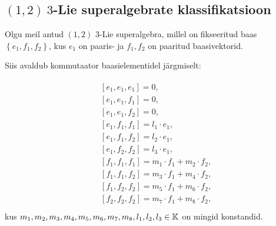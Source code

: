 
\subsection{\texorpdfstring{$(1, 2)\ 3$}\ -Lie superalgebrate klassifikatsioon}

Olgu meil antud $(1, 2)$ 3-Lie superalgebra, millel on fikseeritud baas
$\left\{ e_1, f_1, f_2 \right\}$, kus $e_1$ on paaris- ja
$f_1, f_2$ on paaritud baasivektorid.

Siis avaldub kommutaator baasielementidel järgmiselt:

\begin{align}\label{samasused:1-2}
    \begin{split}
        & \left[ e_1, e_1, e_1 \right] = 0, \\
        & \left[ e_1, e_1, f_1 \right] = 0, \\
        & \left[ e_1, e_1, f_2 \right] = 0, \\
        & \left[ e_1, f_1, f_1 \right] = l_1 \cdot e_1, \\
        & \left[ e_1, f_1, f_2 \right] = l_2 \cdot e_1, \\
        & \left[ e_1, f_2, f_2 \right] = l_3 \cdot e_1, \\
        & \left[ f_1, f_1, f_1 \right] = m_1 \cdot f_1 + m_2 \cdot f_2, \\
        & \left[ f_1, f_1, f_2 \right] = m_3 \cdot f_1 + m_4 \cdot f_2, \\
        & \left[ f_1, f_2, f_2 \right] = m_5 \cdot f_1 + m_6 \cdot f_2, \\
        & \left[ f_2, f_2, f_2 \right] = m_7 \cdot f_1 + m_8 \cdot f_2, \\
    \end{split}
\end{align}
kus $m_1, m_2, m_3, m_4, m_5, m_6, m_7, m_8, l_1, l_2, l_3 \in \mathbb{K}$
on mingid konstandid.

